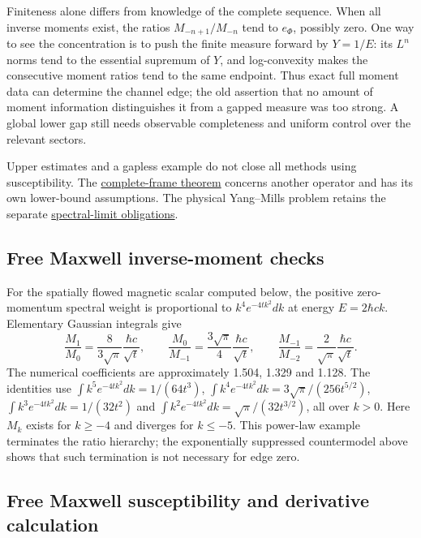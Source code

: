 \documentclass[11pt,a4paper]{article}
\begin{document}
Finiteness alone differs from knowledge of the complete sequence. When
all inverse moments exist, the ratios \(M_{-n+1}/M_{-n}\) tend to
\(e_\Phi\), possibly zero. One way to see the concentration is to push
the finite measure forward by \(Y=1/E\): its \(L^n\) norms tend to the
essential supremum of \(Y\), and log-convexity makes the consecutive
moment ratios tend to the same endpoint. Thus exact full moment data can
determine the channel edge; the old assertion that no amount of moment
information distinguishes it from a gapped measure was too strong. A
global lower gap still needs observable completeness and uniform control
over the relevant sectors.

Upper estimates and a gapless example do not close all methods using
susceptibility. The \href{susceptibility-gap.md}{complete-frame theorem}
concerns another operator and has its own lower-bound assumptions. The
physical Yang--Mills problem retains the separate
\href{mass-gap-obligations-lattice.md}{spectral-limit obligations}.

\hypertarget{free-maxwell-inverse-moment-checks}{%
\subsection{Free Maxwell inverse-moment
checks}\label{free-maxwell-inverse-moment-checks}}

For the spatially flowed magnetic scalar computed below, the positive
zero-momentum spectral weight is proportional to \(k^4e^{-4tk^2}dk\) at
energy \(E=2\hbar ck\). Elementary Gaussian integrals give
\[\frac{M_1}{M_0}=\frac8{3\sqrt\pi}\frac{\hbar c}{\sqrt t},\qquad
 \frac{M_0}{M_{-1}}=\frac{3\sqrt\pi}{4}\frac{\hbar c}{\sqrt t},\qquad
 \frac{M_{-1}}{M_{-2}}=\frac2{\sqrt\pi}\frac{\hbar c}{\sqrt t}.\] The
numerical coefficients are approximately 1.504, 1.329 and 1.128. The
identities use \(\int k^5e^{-4tk^2}dk=1/(64t^3)\),
\(\int k^4e^{-4tk^2}dk=3\sqrt\pi/(256t^{5/2})\),
\(\int k^3e^{-4tk^2}dk=1/(32t^2)\) and
\(\int k^2e^{-4tk^2}dk=\sqrt\pi/(32t^{3/2})\), all over \(k>0\). Here
\(M_k\) exists for \(k\ge-4\) and diverges for \(k\le-5\). This
power-law example terminates the ratio hierarchy; the exponentially
suppressed countermodel above shows that such termination is not
necessary for edge zero.

\hypertarget{free-maxwell-susceptibility-and-derivative-calculation}{%
\subsection{Free Maxwell susceptibility and derivative
calculation}\label{free-maxwell-susceptibility-and-derivative-calculation}}
\end{document}

